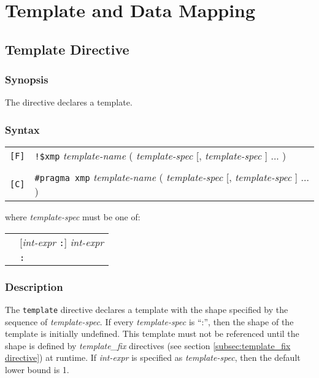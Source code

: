 \section{Template and Data Mapping}

\subsection{Template Directive}
\subsubsection*{Synopsis}

The {\tt {}} directive declares a template. 

\subsubsection*{Syntax}

\begin{tabular}{ll}
\verb![F]! & \verb|!$xmp| {\it template-name} ( {\it template-spec} 
[, {\it template-spec} ] ... ) \\
& \\
\verb![C]! & \verb|#pragma xmp|  {\it template-name} ( {\it template-spec} 
[, {\it template-spec} ] ... ) \\
\end{tabular}
\vspace{0.3cm}

where {\it template-spec} must be one of:

\hspace{\hsize}

\begin{tabular}{ll}
 \hspace{0.5cm} & [{\it int-expr} {\tt :}] {\it int-expr} \\
 \hspace{0.5cm} & {\tt :} \\
\end{tabular}

\subsubsection*{Description}

The {\tt template} directive declares a template with the shape specified by
the sequence of {\it template-spec}. If every {\it template-spec} is
``:'', then the shape of the template is initially undefined. This
template must not be referenced until the shape is defined by {\it
template\_fix} directives (see section \ref{subsec:template_fix
directive}) at runtime. If {\it int-expr} is specified as {\it
template-spec}, then the default lower bound is 1.

